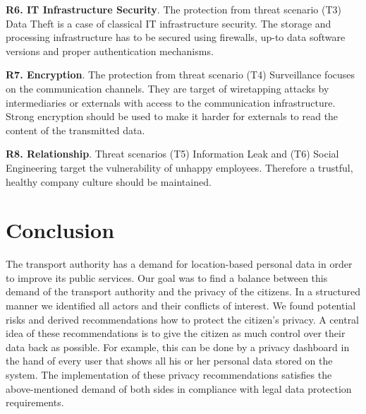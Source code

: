 \documentclass[runningheads,a4paper]{llncs}
\begin{document}
\textbf{R6. IT Infrastructure Security}. The protection from threat scenario (T3) Data Theft is a case of
classical IT infrastructure security. The storage and processing infrastructure has
to be secured using firewalls, up-to data software versions and proper
authentication mechanisms.

\textbf{R7. Encryption}. The protection from threat scenario (T4) Surveillance focuses on the
communication channels. They are target of wiretapping attacks by
intermediaries or externals with access to the communication
infrastructure. Strong encryption should be used to make
it harder for externals to read the content of the transmitted data.

\textbf{R8. Relationship}. Threat scenarios (T5) Information Leak and (T6) Social Engineering
target the vulnerability of unhappy employees. Therefore a trustful,
healthy company culture should be maintained.





\section{Conclusion}

The transport authority has a demand for location-based personal data in order to improve its public services. Our goal was to find a balance between this demand of the transport authority and the privacy of the citizens. In a structured manner we identified all actors and their conflicts of interest. We found potential risks and derived recommendations how to protect the citizen's privacy. A central idea of these recommendations is to give the citizen as much control over their data back as possible. For example, this can be done by a privacy dashboard in the hand of every user that shows all his or her personal data stored on the system. The implementation of these privacy recommendations satisfies the above-mentioned demand of both sides in compliance with legal data protection requirements.



{}
\end{document}
